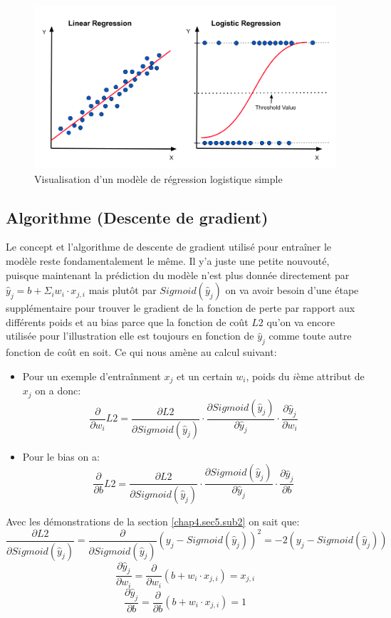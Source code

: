 \begin{figure}
    \centering
    \includegraphics[width=0.75\linewidth]{images/logitReg.png}
    \caption{Visualisation d'un modèle de régression logistique simple}
    \label{fig:fig8}
\end{figure}

\subsection{Algorithme (Descente de gradient)}
\label{chap4.sec6.sub1}
Le concept et l'algorithme de descente de gradient utilisé pour entraîner le modèle reste fondamentalement le même. Il y'a juste une petite nouvouté, puisque maintenant la prédiction du modèle n'est plus donnée directement par \(\hat{y}_j = b + \Sigma_i w_i \cdot x_{j,i}\) mais plutôt par \(Sigmoid(\hat{y}_j)\) on va avoir besoin d'une étape supplémentaire pour trouver le gradient de la fonction de perte par rapport aux différents poids et au bias parce que la fonction de coût \(L2\) qu'on va encore utilisée pour l'illustration elle est toujours en fonction de \(\hat{y}_j\) comme toute autre fonction de coût en soit. Ce qui nous amène au calcul suivant:

\begin{itemize}
    \item Pour un exemple d’entraînment \(x_j\) et un certain \(w_i\), poids du \(i\)ème attribut de \(x_j\) on a donc: \[\frac{\partial}{\partial w_i} L2 = \frac{\partial L2}{\partial Sigmoid(\hat{y}_j)} \cdot \frac{\partial Sigmoid(\hat{y}_j)}{\partial \hat{y}_j} \cdot \frac{\partial \hat{y}_j}{\partial w_i}\]
    \item Pour le bias on a: \[\frac{\partial}{\partial b} L2 = \frac{\partial L2}{\partial Sigmoid(\hat{y}_j)} \cdot \frac{\partial Sigmoid(\hat{y}_j)}{\partial \hat{y}_j} \cdot \frac{\partial \hat{y}_j}{\partial b}\]
\end{itemize}

Avec les démonstrations de la section \ref{chap4.sec5.sub2} on sait que:  \[\frac{\partial L2}{\partial Sigmoid(\hat{y}_j)} = \frac{\partial}{\partial Sigmoid(\hat{y}_j)} (y_j - Sigmoid(\hat{y}_j))^2 = -2(y_j - Sigmoid(\hat{y}_j))\]
\[\frac{\partial \hat{y}_j}{\partial w_i} = \frac{\partial}{\partial w_i} (b + w_i \cdot x_{j,i}) = x_{j,i}\]
\[\frac{\partial \hat{y}_j}{\partial b} = \frac{\partial}{\partial b} (b + w_i \cdot x_{j,i}) = 1\]

